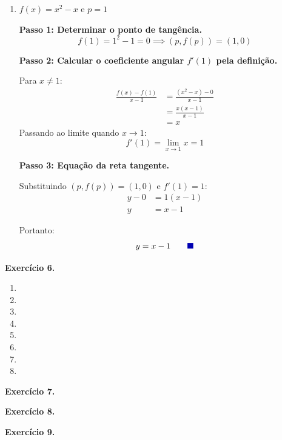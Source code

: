 \documentclass[12pt,a4paper]{article}
\newcommand{\qedsymbolmath}{\tag*{\textcolor{blue!70!black}{\rule{1.6ex}{1.6ex}}}}
\begin{document}
\begin{enumerate}
    \item $f(x) = x^2 - x$ e $p = 1$
    
    \textbf{Passo 1: Determinar o ponto de tangência.}
    \[
    f(1) = 1^2 - 1 = 0 \implies (p, f(p)) = (1, 0)
    \]

    \textbf{Passo 2: Calcular o coeficiente angular $f'(1)$ pela definição.}

    Para $x \neq 1$:
    \begin{align*}
        \frac{f(x) - f(1)}{x - 1} &= \frac{(x^2 - x) - 0}{x - 1} \\[0.25cm]
        &= \frac{x(x - 1)}{x - 1} \\[0.25cm]
        &= x
    \end{align*}
    Passando ao limite quando $x \to 1$:
    \[
    f'(1) = \lim_{x \to 1} x = 1
    \]

    \textbf{Passo 3: Equação da reta tangente.}

    Substituindo $(p, f(p)) = (1, 0)$ e $f'(1) = 1$:
    \begin{align*}
        y - 0 &= 1(x - 1) \\[0.25cm]
        y &= x - 1
    \end{align*}

    Portanto:
    \begin{equation*}
        y = x - 1 \qedsymbolmath
    \end{equation*}
\end{enumerate}

\vspace{0.5cm}
\noindent\textbf{Exercício 6.}
\begin{enumerate}
    \renewcommand{\theenumi}{\alph{enumi}}
    \renewcommand{\labelenumi}{\theenumi)}
    \item 
    \item 
    \item 
    \item 
    \item 
    \item 
    \item 
    \item 
\end{enumerate}

\vspace{0.5cm}
\noindent\textbf{Exercício 7.}

\vspace{0.5cm}
\noindent\textbf{Exercício 8.}

\vspace{0.5cm}
\noindent\textbf{Exercício 9.}
\end{document}
